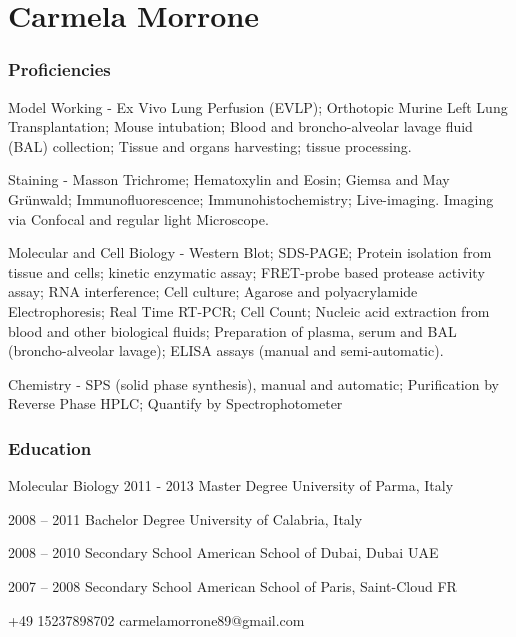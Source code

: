 \documentclass{tccv}
\begin{document}
\part{Carmela Morrone}

\section{Proficiencies}
\begin{eventlist}

\item{Model Working} - Ex Vivo Lung Perfusion (EVLP); Orthotopic Murine Left Lung Transplantation;
Mouse intubation;
Blood and broncho-alveolar lavage fluid (BAL) collection;
Tissue and organs harvesting; tissue processing.

\item{Staining} - Masson Trichrome; Hematoxylin and Eosin; Giemsa and May Grünwald;
Immunofluorescence; Immunohistochemistry; Live-imaging. Imaging via Confocal and regular light Microscope.

\item{Molecular and Cell Biology} - Western Blot; SDS-PAGE; Protein isolation from tissue and cells; kinetic enzymatic assay; FRET-probe based protease activity assay;
RNA interference; Cell culture; Agarose and polyacrylamide Electrophoresis;
Real Time RT-PCR; Cell Count; Nucleic acid extraction from blood and other
biological fluids; Preparation of plasma, serum and BAL (broncho-alveolar
lavage); ELISA assays (manual and semi-automatic).

\item{Chemistry} - SPS (solid phase synthesis), manual and automatic; Purification by Reverse
Phase HPLC; Quantify by Spectrophotometer
\end{eventlist}

\section{Education}

\begin{edu}

\item[Molecular Biology]{2011 - 2013}
     {Master Degree}
     {University of Parma, Italy}

\item{2008 -- 2011}
     {Bachelor Degree}
     {University of Calabria, Italy}

\item{2008 -- 2010}
     {Secondary School}
     {American School of Dubai, Dubai UAE}

\item{2007 -- 2008}
     {Secondary School}
     {American School of Paris, Saint-Cloud FR}

\end{edu}
\personal
    {+49 15237898702}
    {carmelamorrone89@gmail.com}
\end{document}
